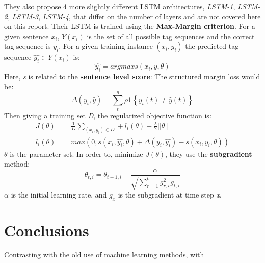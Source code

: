 \documentclass{scrartcl}
\begin{document}
    They also propose 4 more slightly different LSTM architectures, \textit{LSTM-1},
    \textit{LSTM-2}, \textit{LSTM-3}, \textit{LSTM-4}, that differ on the number of layers
    and are not covered here on this report.
    Their LSTM is trained using the \textbf{Max-Margin criterion}. For a given sentence $x_i$, 
    $Y(x_i)$ is the set of all possible tag sequences and the correct tag sequence is $y_i$.
    For a given training instance $(x_i, y_i)$ the predicted tag sequence $\hat{y_i} \in Y(x_i)$
    is:
    \begin{equation}
        \hat{y_i} = arg max s(x_i, y, \theta)
    \end{equation}
    Here, \textit{s} is related to the \textbf{sentence level score}:
    The structured margin loss would be:
    \begin{equation}
        \Delta(y_i, \hat{y}) = \sum_t^n \rho \textbf{1} \left\{ y_i(t) \neq \hat{y}(t) \right\}
    \end{equation}
    Then giving a training set \textit{D}, the regularized objective function is:
    \begin{align*}
        J(\theta) &= \frac{1}{\textit{D}} \sum_{(x_i,y_i) \in \textit{D}} + l_i(\theta) + \frac{\lambda}{2} \lvert \lvert \theta \rvert \rvert \\
        l_i(\theta) &= max(0, s(x_i, \hat{y_i}, \theta) + \Delta(y_i, \hat{y_i}) - s(x_i, y_i, \theta))
    \end{align*}
    $\theta$ is the parameter set.
    In order to, minimize $J(\theta)$, they use the \textbf{subgradient} method:
    \begin{equation}
        \theta_{t,i} = \theta_{t-1, i} - \frac{\alpha}{\sqrt{\sum^t_{r=1} g^2_{r,i}}g_{t,i}}
    \end{equation}
    $\alpha$ is the initial learning rate, and $g_x$ is the subgradient at time step \textit{x}.

    \newpage
    \section{Conclusions}
    Contrasting with the old use of machine learning methods, with 
    \newpage
    \medskip
    
    
\end{document}
